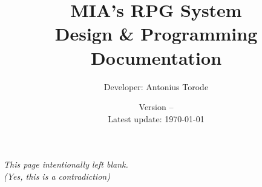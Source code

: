 \documentclass[openany,a4paper,10pt]{book}
\title{MIA's RPG System \\  Design \& Programming Documentation}
\author{Developer: Antonius Torode}
\date{Version -- \version \\ Latest update: \today}
\begin{document}
\frontmatter
\maketitle

\tableofcontents
\newpage
\vspace*{\fill}
\begin{center}
	\textit{This page intentionally left blank. \\(Yes, this is a contradiction)}
\end{center}
\vspace*{\fill}

\mainmatter
\pagestyle{fancy}
\fancyhf{}
\fancyhead[RO, LE]{\thepage}







\backmatter
%
%
\printindex
\end{document}
